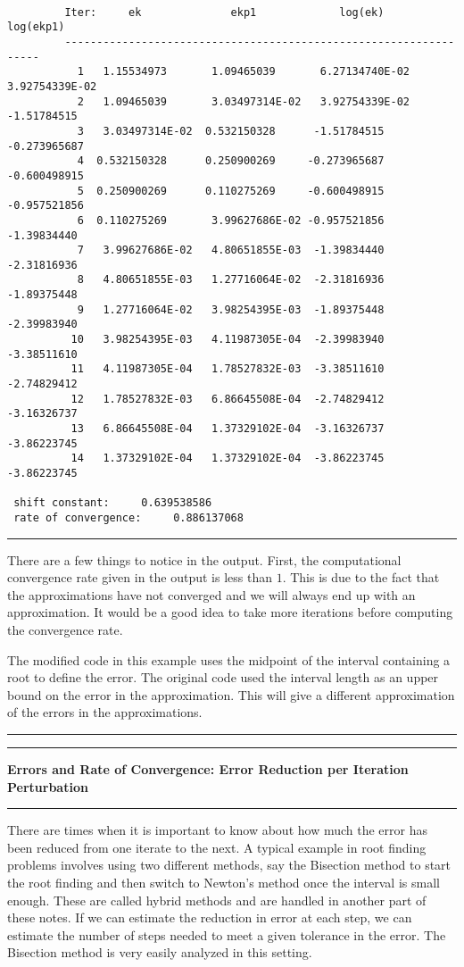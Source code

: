 \documentclass[10pt,fleqn]{article}
\begin{document}
\begin{verbatim}

         Iter:     ek              ekp1             log(ek)       log(ekp1)
         ------------------------------------------------------------------
           1   1.15534973       1.09465039       6.27134740E-02   3.92754339E-02
           2   1.09465039       3.03497314E-02   3.92754339E-02  -1.51784515    
           3   3.03497314E-02  0.532150328      -1.51784515     -0.273965687    
           4  0.532150328      0.250900269     -0.273965687     -0.600498915    
           5  0.250900269      0.110275269     -0.600498915     -0.957521856    
           6  0.110275269       3.99627686E-02 -0.957521856      -1.39834440    
           7   3.99627686E-02   4.80651855E-03  -1.39834440      -2.31816936    
           8   4.80651855E-03   1.27716064E-02  -2.31816936      -1.89375448    
           9   1.27716064E-02   3.98254395E-03  -1.89375448      -2.39983940    
          10   3.98254395E-03   4.11987305E-04  -2.39983940      -3.38511610    
          11   4.11987305E-04   1.78527832E-03  -3.38511610      -2.74829412    
          12   1.78527832E-03   6.86645508E-04  -2.74829412      -3.16326737    
          13   6.86645508E-04   1.37329102E-04  -3.16326737      -3.86223745    
          14   1.37329102E-04   1.37329102E-04  -3.86223745      -3.86223745    

 shift constant:     0.639538586    
 rate of convergence:     0.886137068    

\end{verbatim}
\vskip0.1in\hrule\vskip0.1in
There are a few things to notice in the output. First, the computational
convergence rate given in the output is less than $1$. This is due to the fact
that the approximations have not converged and we will always end up with an
approximation. It would be a good idea to take more iterations before computing
the convergence rate.

The modified code in this example uses the midpoint of the interval containing
a root to define the error. The original code used the interval length as an
upper bound on the error in the approximation. This will give a different
approximation of the errors in the approximations.
\vskip0.1in\hrule\vskip0.1in
\newpage
\vskip0.1in\hrule\vskip0.1in
\noindent
{\bf Errors and Rate of Convergence: Error Reduction per Iteration
Perturbation }
\vskip0.1in\hrule\vskip0.1in
There are times when it is important to know about how much the error has been
reduced from one iterate to the next. A typical example in root finding problems
involves using two different methods, say the Bisection method to start the root
finding and then switch to Newton's method once the interval is small enough.
These are called hybrid methods and are handled in another part of these notes.
If we can estimate the reduction in error at each step, we can estimate the
number of steps needed to meet a given tolerance in the error. The Bisection
method is very easily analyzed in this setting. 
\end{document}
